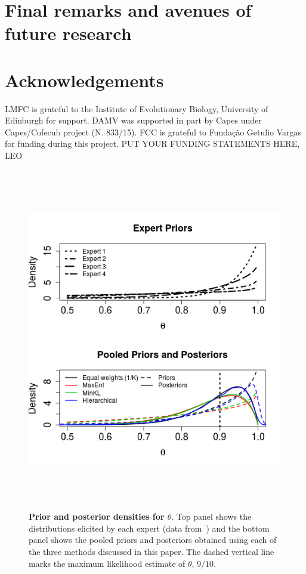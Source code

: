 \documentclass[a4paper, notitlepage, 10pt]{article}
\begin{document}
\section*{Final remarks and avenues of future research}
\section*{Acknowledgements}
LMFC is grateful to the Institute of Evolutionary Biology, University of Edinburgh for support.
DAMV was supported in part by Capes under Capes/Cofecub project (N. 833/15).
FCC is grateful to Funda\c{c}\~ao Getulio Vargas for funding during this 
project.
PUT YOUR FUNDING STATEMENTS HERE, LEO


\begin{figure}[!ht]
\centering
\includegraphics[width=\textwidth, height = 15cm]{figures/priors_&_posteriors.png}
\caption{\textbf{Prior and posterior densities for $\theta$}.
Top panel shows the distributions elicited by each expert (data from~\cite{savchuk1994}) and the bottom panel shows the pooled priors and posteriors obtained using each of the three methods discussed in this paper.
The dashed vertical line marks the maximum likelihood estimate of $\theta$, $9/10$.}
\label{fig:priors_posteriors_beta}
\end{figure}
\end{document}
